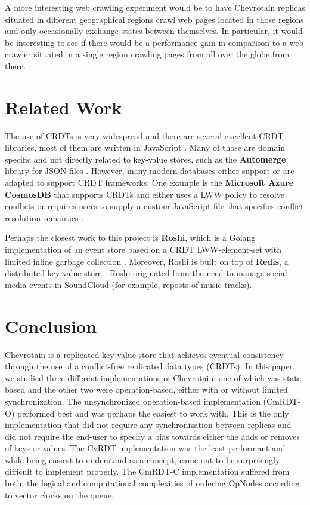 \documentclass[sigconf,nonacm,11pt]{acmart}
\begin{document}
A more interesting web crawling experiment would be to have Chevrotain replicas situated in different geographical regions crawl web pages located in those regions and only occasionally exchange states between themselves. In particular, it would be interesting to see if there would be a performance gain in comparison to a web crawler situated in a single region crawling pages from all over the globe from there.

\section{Related Work} %
The use of CRDTs is very widespread and there are several excellent CRDT libraries, most of them are written in JavaScript \cite{crdt}. Many of those are domain specific and not directly related to key-value stores, such as the \textbf{Automerge} library for JSON files \cite{automerge}. However, many modern databases either support or are adapted to support CRDT frameworks. One example is the \textbf{Microsoft Azure CosmosDB} that supports CRDTs and either uses a LWW policy to resolve conflicts or requires users to supply a custom JavaScript file that specifies conflict resolution semantics \cite{cosmosdb}. 

Perhaps the closest work to this project is \textbf{Roshi}, which is a Golang implementation of an event store based on a CRDT LWW-element-set with limited inline garbage collection \cite{roshi}. Moreover, Roshi is built on top of \textbf{Redis}, a distributed key-value store \cite{redis}. Roshi originated from the need to manage social media events in SoundCloud (for example, reposts of music tracks).

\section{Conclusion}
Chevrotain is a replicated key value store that achieves eventual consistency through the use of a conflict-free replicated data types (CRDTs). In this paper, we studied three different implementations of Chevrotain, one of which was state-based and the other two were operation-based, either with or without limited synchronization. The unsynchronized operation-based implementation (CmRDT-O) performed best and was perhaps the easiest to work with. This is the only implementation that did not require any synchronization between replicas and did not require the end-user to specify a bias towards either the adds or removes of keys or values. The CvRDT implementation was the least performant and while being easiest to understand as a concept, came out to be surprisingly difficult to implement properly. The CmRDT-C implementation suffered from both, the logical and computational complexities of ordering OpNodes according to vector clocks on the queue.
\end{document}
